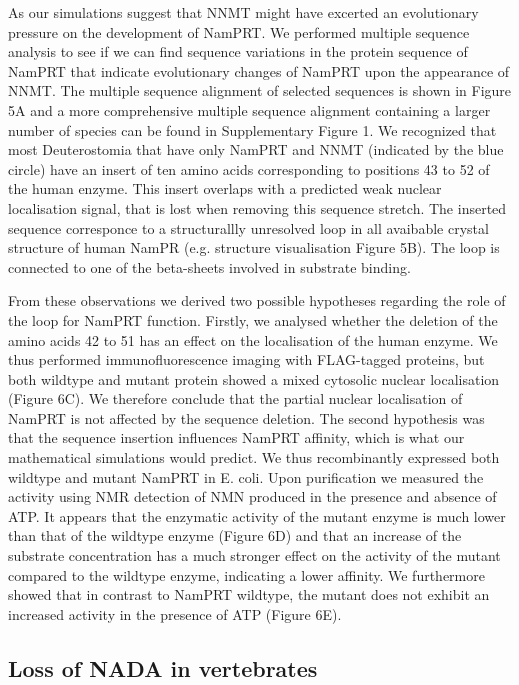 As our simulations suggest that NNMT might have excerted an evolutionary pressure on the development of NamPRT. We performed multiple sequence analysis to see if we can find sequence variations in the protein sequence of NamPRT that indicate evolutionary changes of NamPRT upon the appearance of NNMT. The multiple sequence alignment of selected sequences is shown in Figure 5A and a more comprehensive multiple sequence alignment containing a larger number of species can be found in Supplementary Figure 1.  We recognized that most Deuterostomia that have only NamPRT and NNMT (indicated by the blue circle) have an insert of ten amino acids corresponding to positions 43 to 52 of the human enzyme. This insert overlaps with a predicted weak nuclear localisation signal, that is lost when removing this sequence stretch. The inserted sequence corresponce to a structurallly unresolved loop in all avaibable crystal structure of human NamPR (e.g. \cite{Wang2006} structure visualisation Figure 5B). The loop is connected to one of the beta-sheets involved in substrate binding.

From these observations we derived two possible hypotheses regarding the role of the loop for NamPRT function. Firstly, we analysed whether the deletion of the amino acids 42 to 51 has an effect on the localisation of the human enzyme. We thus performed immunofluorescence imaging with FLAG-tagged proteins, but both wildtype and mutant protein showed a mixed cytosolic nuclear localisation (Figure 6C). We therefore conclude that the partial nuclear localisation of NamPRT is not affected by the sequence deletion.
The second hypothesis was that the sequence insertion influences NamPRT affinity, which is what our mathematical simulations would predict. We thus recombinantly expressed  both wildtype and mutant  NamPRT  in E. coli.  Upon purification we measured the activity using NMR detection of NMN produced in the presence and absence of ATP. It appears that the enzymatic activity of the mutant enzyme is much lower than that of the wildtype enzyme (Figure 6D) and that an increase of the substrate concentration has a much stronger effect on the activity of the mutant compared to the wildtype enzyme, indicating a lower affinity.  We furthermore showed  that in contrast to NamPRT wildtype, the mutant does not exhibit an increased activity in the presence of ATP (Figure 6E). 

\subsection{Loss of NADA in vertebrates}

